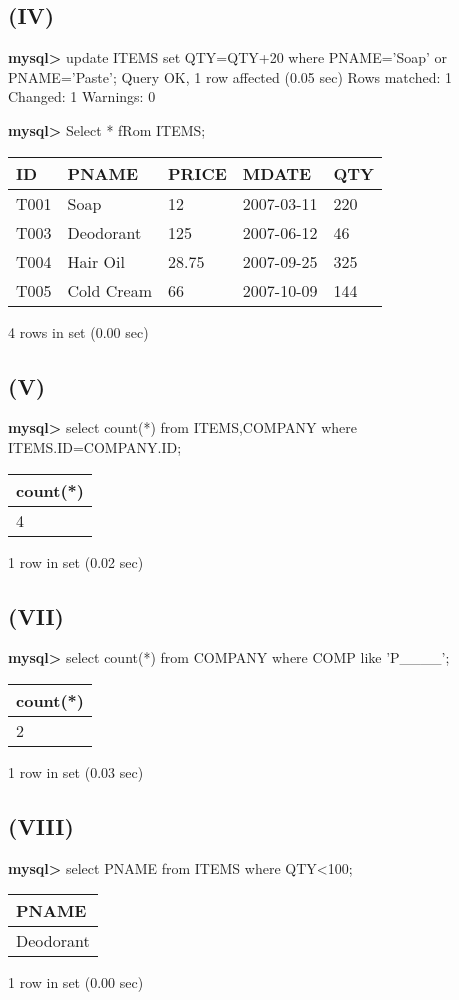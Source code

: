 \documentclass[11pt]{article}
\begin{document}
\subsection{(IV)}
\label{sec:orga869dc9}
\textbf{mysql>} update ITEMS set QTY=QTY+20 where PNAME='Soap' or PNAME='Paste';
Query OK, 1 row affected (0.05 sec)
Rows matched: 1  Changed: 1  Warnings: 0

\textbf{mysql>} Select * fRom ITEMS;
\begin{center}
\begin{tabular}{|l|l|l|l|l|}
\hline
ID & PNAME & PRICE & MDATE & QTY \\
\hline
T001 & Soap & 12 & 2007-03-11 & 220 \\
T003 & Deodorant & 125 & 2007-06-12 & 46 \\
T004 & Hair Oil & 28.75 & 2007-09-25 & 325 \\
T005 & Cold Cream & 66 & 2007-10-09 & 144 \\
\hline
\end{tabular}
\end{center}
4 rows in set (0.00 sec)

\subsection{(V)}
\label{sec:orgc2c62ec}
\textbf{mysql>} select count(*) from ITEMS,COMPANY where ITEMS.ID=COMPANY.ID;
\begin{center}
\begin{tabular}{|l|}
\hline
count(*) \\
\hline
4 \\
\hline
\end{tabular}
\end{center}
1 row in set (0.02 sec)

\subsection{(VII)}
\label{sec:org3d1fa7e}
\textbf{mysql>} select count(*) from COMPANY where COMP like 'P\_\_\_\_';
\begin{center}
\begin{tabular}{|l|}
\hline
count(*) \\
\hline
2 \\
\hline
\end{tabular}
\end{center}
1 row in set (0.03 sec)

\subsection{(VIII)}
\label{sec:org9981cae}
\textbf{mysql>} select PNAME from ITEMS where QTY<100;
\begin{center}
\begin{tabular}{|l|}
\hline
PNAME \\
\hline
Deodorant \\
\hline
\end{tabular}
\end{center}
1 row in set (0.00 sec)
\end{document}
